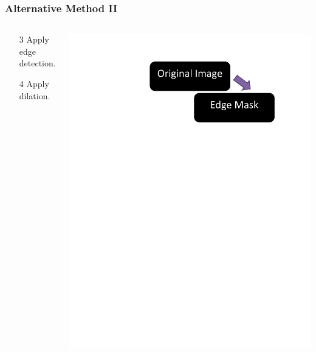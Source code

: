 \documentclass{beamer}
\begin{document}
\begin{frame}
\frametitle{Alternative Method II}
\begin{columns}
\begin{column}{0.5\textwidth}
\begin{enumerate}
\item[3] Apply edge detection.
\item[4] Apply dilation.
\end{enumerate}
\end{column}
\begin{column}{0.5\textwidth}
\includegraphics[width=1\textwidth,trim={2.5in 7.5in 1in 0in},clip]{alternative_method_diagram_2}
\end{column}
\end{columns}
\end{frame}
\end{document}
